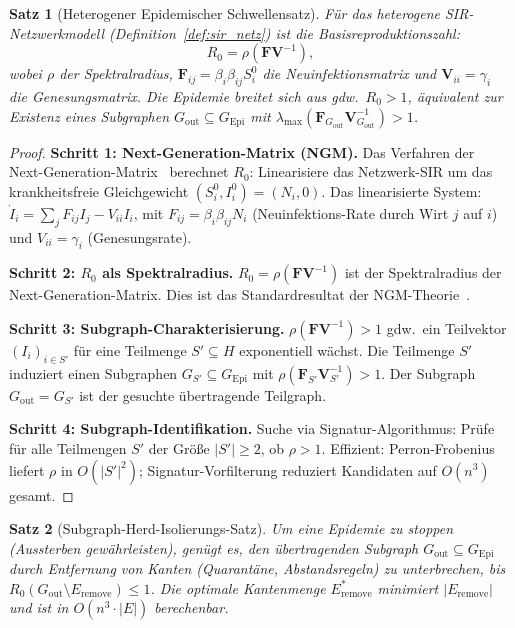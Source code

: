 ﻿\documentclass[a4paper,12pt]{article}
\theoremstyle{plain}
\newtheorem{satz}{Satz}
\theoremstyle{definition}
\theoremstyle{remark}
\newcommand{\Gepi}{G_{\mathrm{Epi}}}
\begin{document}
\begin{satz}[Heterogener Epidemischer Schwellensatz]
\label{satz:hetero_threshold}
F\"ur das heterogene SIR-Netzwerkmodell (Definition~\ref{def:sir_netz})
ist die Basisreproduktionszahl:
\[
R_0 = \rho(\mathbf{F}\mathbf{V}^{-1}),
\]
wobei $\rho$ der Spektralradius, $\mathbf{F}_{ij} = \beta_i \beta_{ij} S_i^0$
die Neuinfektionsmatrix und $\mathbf{V}_{ii} = \gamma_i$ die Genesungsmatrix.
Die Epidemie breitet sich aus gdw.\ $R_0 > 1$,
\"aquivalent zur Existenz eines Subgraphen $G_{\mathrm{out}} \subseteq \Gepi$
mit $\lambda_{\max}(\mathbf{F}_{G_{\mathrm{out}}}\mathbf{V}_{G_{\mathrm{out}}}^{-1}) > 1$.
\end{satz}

\begin{proof}
\textbf{Schritt 1: Next-Generation-Matrix (NGM).}
Das Verfahren der Next-Generation-Matrix~\cite{diekmann1990} berechnet $R_0$:
Linearisiere das Netzwerk-SIR um das krankheitsfreie Gleichgewicht
$(S_i^0, I_i^0) = (N_i, 0)$.
Das linearisierte System:
$\dot{I}_i = \sum_j F_{ij} I_j - V_{ii} I_i$,
mit $F_{ij} = \beta_i \beta_{ij} N_i$ (Neuinfektions-Rate durch Wirt $j$ auf $i$)
und $V_{ii} = \gamma_i$ (Genesungsrate).

\textbf{Schritt 2: $R_0$ als Spektralradius.}
$R_0 = \rho(\mathbf{F}\mathbf{V}^{-1})$ ist der Spektralradius der
Next-Generation-Matrix. Dies ist das Standardresultat der NGM-Theorie~\cite{diekmann1990}.

\textbf{Schritt 3: Subgraph-Charakterisierung.}
$\rho(\mathbf{F}\mathbf{V}^{-1}) > 1$ gdw.\ ein Teilvektor $(I_i)_{i \in S'}$
f\"ur eine Teilmenge $S' \subseteq H$ exponentiell w\"achst.
Die Teilmenge $S'$ induziert einen Subgraphen $G_{S'} \subseteq \Gepi$
mit $\rho(\mathbf{F}_{S'}\mathbf{V}_{S'}^{-1}) > 1$.
Der Subgraph $G_{\mathrm{out}} = G_{S'}$ ist der gesuchte
\"ubertragende Teilgraph.

\textbf{Schritt 4: Subgraph-Identifikation.}
Suche via Signatur-Algorithmus: Pr\"ufe f\"ur alle Teilmengen $S'$ der
Gr\"o{\ss}e $|S'| \geq 2$, ob $\rho > 1$.
Effizient: Perron-Frobenius liefert $\rho$ in $O(|S'|^2)$;
Signatur-Vorfilterung reduziert Kandidaten auf $O(n^3)$ gesamt.
\end{proof}

\begin{satz}[Subgraph-Herd-Isolierungs-Satz]
\label{satz:isolation}
Um eine Epidemie zu stoppen (Aussterben gew\"ahrleisten), gen\"ugt es,
den \"ubertragenden Subgraph $G_{\mathrm{out}} \subseteq \Gepi$
durch Entfernung von Kanten (Quarant\"ane, Abstandsregeln) zu
unterbrechen, bis $R_0(G_{\mathrm{out}} \setminus E_{\mathrm{remove}}) \leq 1$.
Die optimale Kantenmenge $E_{\mathrm{remove}}^*$ minimiert $|E_{\mathrm{remove}}|$
und ist in $O(n^3 \cdot |E|)$ berechenbar.
\end{satz}
\end{document}
